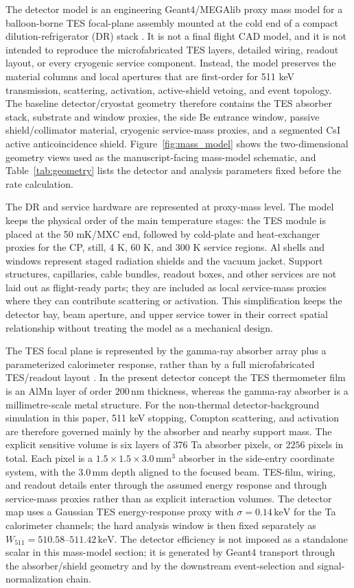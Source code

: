 \documentclass[preprint,12pt]{elsarticle}
\newcommand{\keV}{\,\mathrm{keV}}
\newcommand{\wii}{W_{511}}
\begin{document}
The detector model is an engineering Geant4/MEGAlib proxy mass model for a balloon-borne TES focal-plane assembly mounted at the cold end of a compact dilution-refrigerator (DR) stack \cite{Shirazi2023,Gottardi2021TESReview}. It is not a final flight CAD model, and it is not intended to reproduce the microfabricated TES layers, detailed wiring, readout layout, or every cryogenic service component. Instead, the model preserves the material columns and local apertures that are first-order for 511 keV transmission, scattering, activation, active-shield vetoing, and event topology. The baseline detector/cryostat geometry therefore contains the TES absorber stack, substrate and window proxies, the side Be entrance window, passive shield/collimator material, cryogenic service-mass proxies, and a segmented CsI active anticoincidence shield. Figure~\ref{fig:mass_model} shows the two-dimensional geometry views used as the manuscript-facing mass-model schematic, and Table~\ref{tab:geometry} lists the detector and analysis parameters fixed before the rate calculation.

The DR and service hardware are represented at proxy-mass level. The model keeps the physical order of the main temperature stages: the TES module is placed at the 50 mK/MXC end, followed by cold-plate and heat-exchanger proxies for the CP, still, 4 K, 60 K, and 300 K service regions. Al shells and windows represent staged radiation shields and the vacuum jacket. Support structures, capillaries, cable bundles, readout boxes, and other services are not laid out as flight-ready parts; they are included as local service-mass proxies where they can contribute scattering or activation. This simplification keeps the detector bay, beam aperture, and upper service tower in their correct spatial relationship without treating the model as a mechanical design.

The TES focal plane is represented by the gamma-ray absorber array plus a parameterized calorimeter response, rather than by a full microfabricated TES/readout layout \cite{Zhang2022TESGamma}. In the present detector concept the TES thermometer film is an AlMn layer of order $200\,\mathrm{nm}$ thickness, whereas the gamma-ray absorber is a millimetre-scale metal structure. For the non-thermal detector-background simulation in this paper, 511 keV stopping, Compton scattering, and activation are therefore governed mainly by the absorber and nearby support mass. The explicit sensitive volume is six layers of 376 Ta absorber pixels, or $2256$ pixels in total. Each pixel is a $1.5\times1.5\times3.0\,\mathrm{mm^3}$ absorber in the side-entry coordinate system, with the $3.0\,\mathrm{mm}$ depth aligned to the focused beam. TES-film, wiring, and readout details enter through the assumed energy response and through service-mass proxies rather than as explicit interaction volumes. The detector map uses a Gaussian TES energy-response proxy with $\sigma=0.14\keV$ for the Ta calorimeter channels; the hard analysis window is then fixed separately as $\wii=510.58$--$511.42\keV$. The detector efficiency is not imposed as a standalone scalar in this mass-model section; it is generated by Geant4 transport through the absorber/shield geometry and by the downstream event-selection and signal-normalization chain.
\end{document}
